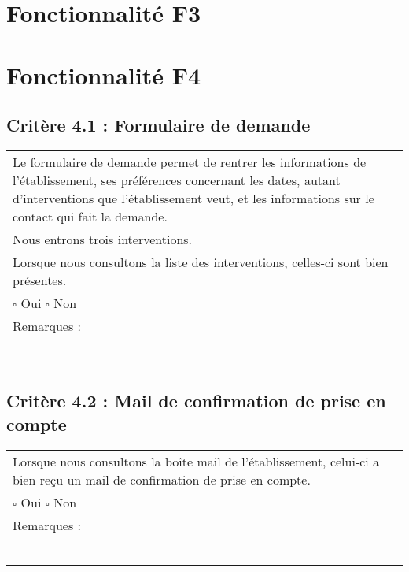   		
\section{Fonctionnalité F3}


\section{Fonctionnalité F4}
	\subsection*{Critère 4.1 : Formulaire de demande }
  		\begin{center}
    	 		\begin{tabular}[h]{|p{}|}
			\hline
				Le formulaire de demande permet de rentrer les informations de l'établissement, ses préférences concernant les dates, autant d'interventions que l'établissement veut, et les informations sur le contact qui fait la demande.\\
				Nous entrons trois interventions. \\
				Lorsque nous consultons la liste des interventions, celles-ci sont bien présentes. \\
				
				$\square$ Oui  \hfill \hfill $\square$ Non \\\hline Remarques : \\ ~\\
			 \\\hline
     		\end{tabular}
  		\end{center}	
  		
  	\subsection*{Critère 4.2 : Mail de confirmation de prise en compte}
  		\begin{center}
    	 		\begin{tabular}[h]{|p{}|}
			\hline
				Lorsque nous consultons la boîte mail de l'établissement, celui-ci a bien reçu un mail de confirmation de prise en compte.\\
				
				$\square$ Oui  \hfill \hfill $\square$ Non \\\hline Remarques : \\ ~\\
			 \\\hline
     		\end{tabular}
  		\end{center}	
  		
